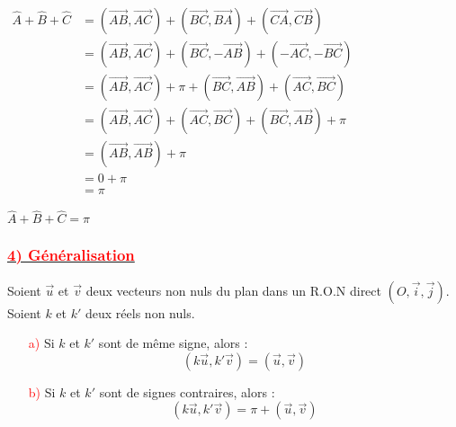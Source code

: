 \documentclass[a4paper,12pt]{article}
\begin{document}
\(
\begin{aligned}
    \widehat{A} + \widehat{B} + \widehat{C} & = (\overrightarrow{AB}, \overrightarrow{AC}) + (\overrightarrow{BC}, \overrightarrow{BA}) + (\overrightarrow{CA}, \overrightarrow{CB})       \\
                                            & = (\overrightarrow{AB}, \overrightarrow{AC}) + (\overrightarrow{BC}, -\overrightarrow{AB}) + (-\overrightarrow{AC}, -\overrightarrow{BC})    \\
                                            & = (\overrightarrow{AB}, \overrightarrow{AC}) + \pi + (\overrightarrow{BC}, \overrightarrow{AB}) + (\overrightarrow{AC}, \overrightarrow{BC}) \\
                                            & = (\overrightarrow{AB}, \overrightarrow{AC}) + (\overrightarrow{AC}, \overrightarrow{BC}) + (\overrightarrow{BC}, \overrightarrow{AB}) + \pi \\
                                            & = (\overrightarrow{AB}, \overrightarrow{AB}) + \pi                                                                                           \\
                                            & = 0 + \pi                                                                                                                                    \\
                                            & = \pi
\end{aligned}
\)

\( \widehat{A} + \widehat{B} + \widehat{C} = \pi \)

\subsubsection*{\underline{\textcolor{red}{4) Généralisation}}}

Soient \( \overrightarrow{u} \) et \( \overrightarrow{v} \) deux vecteurs non nuls du plan dans un R.O.N direct \( (O, \overrightarrow{i}, \overrightarrow{j}) \).\\
Soient \( k \) et \( k' \) deux réels non nuls.

\begin{itemize}
    \item[\textcolor{red}{a)}] Si \( k \) et \( k' \) sont de même signe, alors :
          \[
              (k \overrightarrow{u}, k' \overrightarrow{v}) = (\overrightarrow{u}, \overrightarrow{v})
          \]

    \item[\textcolor{red}{b)}] Si \( k \) et \( k' \) sont de signes contraires, alors :
          \[
              (k \overrightarrow{u}, k' \overrightarrow{v}) = \pi + (\overrightarrow{u}, \overrightarrow{v})
          \]
\end{itemize}
\end{document}
